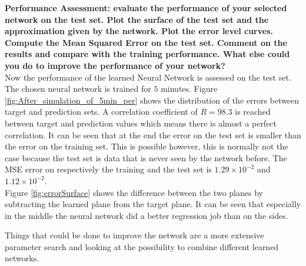 \documentclass[a4paper,10pt]{article}
\begin{document}
\textbf{Performance Assessment: evaluate the performance of your selected network on the test set. Plot the surface of
	the test set and the approximation given by the network. Plot the error level curves. Compute the Mean Squared
	Error on the test set. Comment on the results and compare with the training performance. What else could you
	do to improve the performance of your network?}\\

Now the performance of the learned Neural Network is assessed on the test set. The chosen neural network is trained for $ 5 $ minutes.
Figure \ref{fig:After_simulation_of_5min_per} shows the distribution of the errors between target and prediction sets. A correlation coefficient of $ R = 98.3 $ is reached between target and prediction values which means there is almost a perfect correlation. It can be seen that at the end the error on the test set is smaller than the error on the training set. This is possible however, this is normally not the case because the test set is data that is never seen by the network before. The MSE error on respectively the training and the test set is $ 1.29 \times 10^{-2} $ and $ 1.12 \times 10^{-2} $. \\ 
Figure \ref{fig:errorSurface} shows the difference between the two planes by subtracting the learned plane from the target plane. It can be seen that especially in the middle the neural network did a better regression job than on the sides. 





Things that could be done to improve the network are a more extensive parameter search and looking at the possibility to combine different learned networks. 
\end{document}
